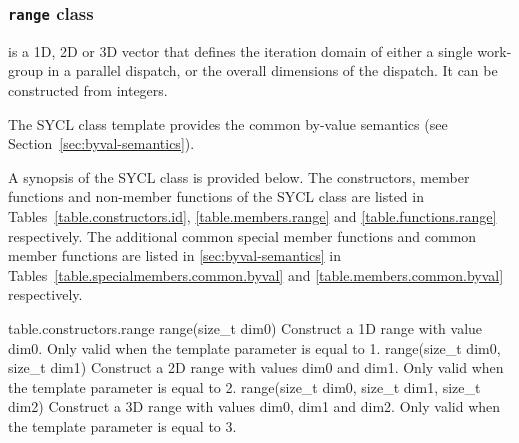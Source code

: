 
\subsubsection{\texttt{range} class}
\label{range-class}

 is a 1D, 2D or 3D vector that defines
the iteration domain of either a single work-group in a parallel
dispatch, or the overall dimensions of the dispatch. It can be
constructed from integers.

The SYCL  class template provides the common by-value
semantics (see Section~\ref{sec:byval-semantics}).

A synopsis of the SYCL  class is provided below. The constructors, member functions and non-member functions of the SYCL  class are listed in Tables~\ref{table.constructors.id}, \ref{table.members.range} and \ref{table.functions.range} respectively. The additional common special member functions and common member functions are listed in \ref{sec:byval-semantics} in Tables~\ref{table.specialmembers.common.byval} and \ref{table.members.common.byval} respectively.



{table.constructors.range}
  \addRow
    {range(size_t dim0)}
    {
        Construct a 1D range with value dim0.
        Only valid when the template parameter  is equal
          to 1.
    }
  \addRow
    {range(size_t dim0, size_t dim1)}
    {
        Construct a 2D range with values dim0 and dim1.
        Only valid when the template parameter  is equal
        to 2.
    }
  \addRow
    {range(size_t dim0, size_t dim1, size_t dim2)}
    {
        Construct a 3D range with values dim0, dim1 and dim2.
        Only valid when the template parameter  is equal
  to 3.
    }
\completeTable

